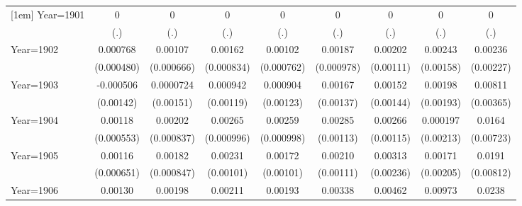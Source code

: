 \begin{table}[htbp]
\begin{tabular}{l*{8}{c}}
[1em]
Year=1901           &           0         &           0         &           0         &           0         &           0         &           0         &           0         &           0         \\
                    &         (.)         &         (.)         &         (.)         &         (.)         &         (.)         &         (.)         &         (.)         &         (.)         \\
[1em]
Year=1902           &    0.000768         &     0.00107         &     0.00162\sym{*}  &     0.00102         &     0.00187\sym{*}  &     0.00202\sym{*}  &     0.00243         &     0.00236         \\
                    &  (0.000480)         &  (0.000666)         &  (0.000834)         &  (0.000762)         &  (0.000978)         &   (0.00111)         &   (0.00158)         &   (0.00227)         \\
[1em]
Year=1903           &   -0.000506         &   0.0000724         &    0.000942         &    0.000904         &     0.00167         &     0.00152         &     0.00198         &     0.00811\sym{**} \\
                    &   (0.00142)         &   (0.00151)         &   (0.00119)         &   (0.00123)         &   (0.00137)         &   (0.00144)         &   (0.00193)         &   (0.00365)         \\
[1em]
Year=1904           &     0.00118\sym{**} &     0.00202\sym{**} &     0.00265\sym{***}&     0.00259\sym{**} &     0.00285\sym{**} &     0.00266\sym{**} &    0.000197         &      0.0164\sym{**} \\
                    &  (0.000553)         &  (0.000837)         &  (0.000996)         &  (0.000998)         &   (0.00113)         &   (0.00115)         &   (0.00213)         &   (0.00723)         \\
[1em]
Year=1905           &     0.00116\sym{*}  &     0.00182\sym{**} &     0.00231\sym{**} &     0.00172\sym{*}  &     0.00210\sym{*}  &     0.00313         &     0.00171         &      0.0191\sym{**} \\
                    &  (0.000651)         &  (0.000847)         &   (0.00101)         &   (0.00101)         &   (0.00111)         &   (0.00236)         &   (0.00205)         &   (0.00812)         \\
[1em]
Year=1906           &     0.00130\sym{**} &     0.00198\sym{**} &     0.00211\sym{**} &     0.00193\sym{**} &     0.00338         &     0.00462\sym{*}  &     0.00973         &      0.0238\sym{***}\\

\end{tabular}
\end{table}
